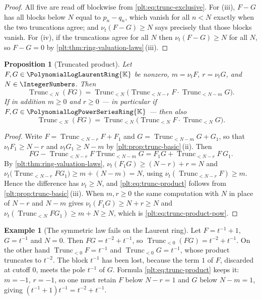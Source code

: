 \documentclass[11pt,oneside]{article}
\theoremstyle{plain}
\newtheorem{proposition}[theorem]{Proposition}
\theoremstyle{definition}
\newtheorem{example}[theorem]{Example}
\theoremstyle{remark}
\newcommand{\K}{\mathbb{K}}
\newcommand{\PLpow}{\PolynomialLogPowerSeriesRing{\K}}   %
\newcommand{\PLlau}{\PolynomialLogLaurentRing{\K}}       %
\newcommand{\ordt}{\nu_{t}}                              %
\newcommand{\Trunc}[2]{\operatorname{Trunc}_{<#2}#1}     %
\begin{document}
\begin{proof}
All five are read off blockwise from \eqref{plt:eq:trunc-exclusive}.  For (iii),
\(F-G\) has all blocks below \(N\) equal to \(p_n-q_n\), which vanish for all
\(n<N\) exactly when the two truncations agree; and \(\ordt(F-G)\ge N\) says
precisely that those blocks vanish.  For (iv), if the truncations agree for
all \(N\) then \(\ordt(F-G)\ge N\) for all \(N\), so \(F-G=0\) by
\cref{plt:thm:ring-valuation-laws}\,(iii).
\end{proof}

\begin{proposition}[Truncated product]
\label{plt:prop:trunc-product}
Let \(F,G\in\PLlau\) be nonzero, \(m=\ordt F\), \(r=\ordt G\), and
\(N\in\IntegerNumbers\).  Then
\begin{equation}\label{plt:eq:trunc-product}
  \Trunc{(FG)}{N}
  =\Trunc{\bigl(\Trunc{F}{N-r}\cdot\Trunc{G}{N-m}\bigr)}{N}.
\end{equation}
If in addition \(m\ge0\) and \(r\ge0\) --- in particular if
\(F,G\in\PLpow\) --- then also
\begin{equation}\label{plt:eq:trunc-product-pow}
  \Trunc{(FG)}{N}
  =\Trunc{\bigl(\Trunc{F}{N}\cdot\Trunc{G}{N}\bigr)}{N}.
\end{equation}
\end{proposition}

\begin{proof}
Write \(F=\Trunc{F}{N-r}+F_1\) and \(G=\Trunc{G}{N-m}+G_1\), so that
\(\ordt F_1\ge N-r\) and \(\ordt G_1\ge N-m\) by
\cref{plt:prop:trunc-basic}\,(ii).  Then
\[
  FG-\Trunc{F}{N-r}\Trunc{G}{N-m}
  =F_1G+\Trunc{F}{N-r}\,G_1 .
\]
By \cref{plt:thm:ring-valuation-laws}, \(\ordt(F_1G)\ge(N-r)+r=N\) and
\(\ordt\bigl(\Trunc{F}{N-r}G_1\bigr)\ge m+(N-m)=N\), using
\(\ordt(\Trunc{F}{N-r})\ge m\).  Hence the difference has \(\ordt\ge N\), and
\eqref{plt:eq:trunc-product} follows from
\cref{plt:prop:trunc-basic}\,(iii).  When \(m,r\ge0\) the same computation
with \(N\) in place of \(N-r\) and \(N-m\) gives
\(\ordt(F_1G)\ge N+r\ge N\) and
\(\ordt(\Trunc{F}{N}G_1)\ge m+N\ge N\), which is
\eqref{plt:eq:trunc-product-pow}.
\end{proof}

\begin{example}[The symmetric law fails on the Laurent ring]
\label{plt:ex:trunc-product-fails}
Let \(F=t^{-1}+1\), \(G=t^{-1}\) and \(N=0\).  Then \(FG=t^{-2}+t^{-1}\), so
\(\Trunc{(FG)}{0}=t^{-2}+t^{-1}\).  On the other hand
\(\Trunc{F}{0}=t^{-1}\) and \(\Trunc{G}{0}=t^{-1}\), whose product truncates
to \(t^{-2}\).  The block \(t^{-1}\) has been lost, because the term \(1\) of
\(F\), discarded at cutoff \(0\), meets the pole \(t^{-1}\) of \(G\).
Formula \eqref{plt:eq:trunc-product} keeps it: \(m=-1\), \(r=-1\), so one must
retain \(F\) below \(N-r=1\) and \(G\) below \(N-m=1\), giving
\((t^{-1}+1)t^{-1}=t^{-2}+t^{-1}\).
\end{example}
\end{document}
